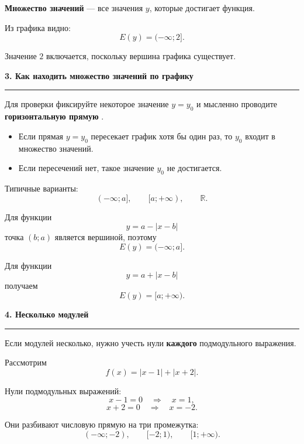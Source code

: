 \documentclass[a4paper,12pt]{article}
\newcommand{\lessonsection}[1]{%
    \vspace{0.6em}
    {\Large\bfseries\color{darkaccent}#1}\par
    \vspace{0.15em}
    {\color{softgray}\rule{\linewidth}{0.8pt}}
    \vspace{0.3em}
}
\newcommand{\important}[1]{%
    {\color{darkaccent}\bfseries #1}%
}
\newcommand{\R}{\mathbb{R}}
\begin{document}
\textbf{Множество значений} --- все значения \(y\), которые достигает функция.

Из графика видно:
\[
E(y)=(-\infty;2].
\]

Значение \(2\) включается, поскольку вершина графика существует.


\lessonsection{3. Как находить множество значений по графику}

Для проверки фиксируйте некоторое значение \(y=y_0\) и мысленно проводите
\important{горизонтальную прямую}.

\begin{itemize}
    \item Если прямая \(y=y_0\) пересекает график хотя бы один раз,
    то \(y_0\) входит в множество значений.
    \item Если пересечений нет, такое значение \(y_0\) не достигается.
\end{itemize}

Типичные варианты:
\[
(-\infty;a],\qquad
[a;+\infty),\qquad
\R.
\]

Для функции
\[
y=a-|x-b|
\]
точка \((b;a)\) является вершиной, поэтому
\[
E(y)=(-\infty;a].
\]

Для функции
\[
y=a+|x-b|
\]
получаем
\[
E(y)=[a;+\infty).
\]


\lessonsection{4. Несколько модулей}

Если модулей несколько, нужно учесть нули \textbf{каждого}
подмодульного выражения.

Рассмотрим
\[
f(x)=|x-1|+|x+2|.
\]

Нули подмодульных выражений:
\[
x-1=0 \quad\Longrightarrow\quad x=1,
\]
\[
x+2=0 \quad\Longrightarrow\quad x=-2.
\]

Они разбивают числовую прямую на три промежутка:
\[
(-\infty;-2),\qquad [-2;1),\qquad [1;+\infty).
\]

\begin{center}
\end{center}
\end{document}
